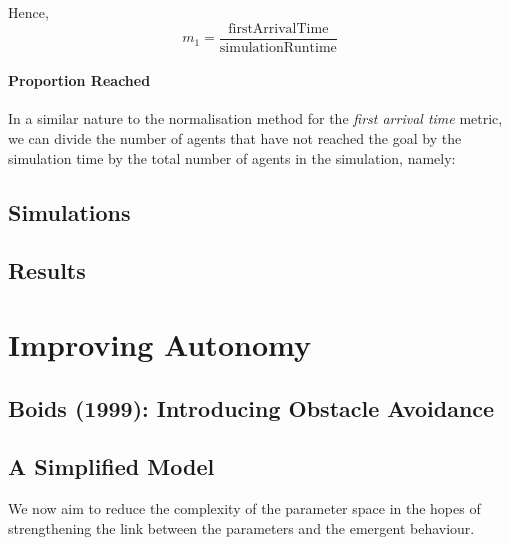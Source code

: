 \documentclass[12pt]{article}
\begin{document}
Hence,
\begin{equation}
    m_1 = \frac{\text{firstArrivalTime}}{\text{simulationRuntime}}
\end{equation}

\paragraph{Proportion Reached}
In a similar nature to the normalisation method for the \emph{first arrival time} metric, we can divide the number of agents that have not reached the goal by the simulation time by the total number of agents in the simulation, namely:





\subsection{Simulations}

\subsection{Results}


\section{Improving Autonomy}

\subsection{Boids (1999): Introducing Obstacle Avoidance}

\subsection{A Simplified Model}
We now aim to reduce the complexity of the parameter space in the hopes of strengthening the link between the parameters and the emergent behaviour.
\end{document}
